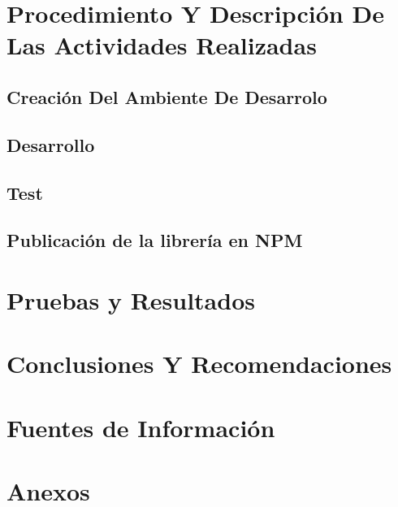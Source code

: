 \documentclass[a4paper,12pt]{report}
\begin{document}
		\chapter {Procedimiento Y Descripción De Las Actividades Realizadas}
			
			
			\section {Creación Del Ambiente De Desarrolo}
				
				
			\section {Desarrollo}
				
				
			\section {Test }
				
				
			\section {Publicación de la librería en NPM }
				
			
		
		\chapter {Pruebas y Resultados}
			
		
		\chapter {Conclusiones Y Recomendaciones}
		
		\chapter {Fuentes de Información}
			
			
		\chapter {Anexos}
\end{document}
